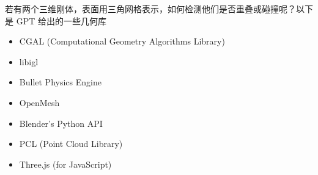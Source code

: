 

\begin{issues}
\issueDraft
\end{issues}

若有两个三维刚体，表面用三角网格表示，如何检测他们是否重叠或碰撞呢？以下是 GPT 给出的一些几何库

\begin{itemize}
\item CGAL (Computational Geometry Algorithms Library)
\item libigl
\item Bullet Physics Engine
\item OpenMesh
\item Blender's Python API
\item PCL (Point Cloud Library)
\item Three.js (for JavaScript)
\end{itemize}
